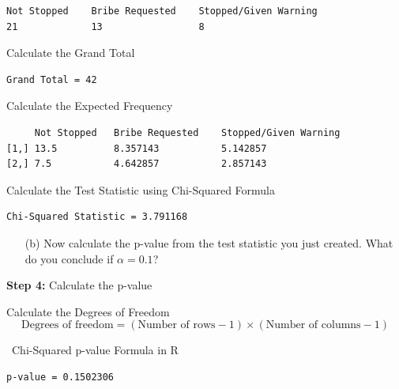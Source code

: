 \documentclass[12pt,letterpaper]{article}
\begin{document}
\begin{verbatim}
Not Stopped    Bribe Requested	  Stopped/Given Warning 
21             13                 8 
\end{verbatim}

\vspace{0.5cm}
\noindent Calculate the Grand Total


\begin{verbatim}
Grand Total = 42
\end{verbatim}

\vspace{0.5cm}
\noindent Calculate the Expected Frequency


\begin{verbatim}
     Not Stopped   Bribe Requested    Stopped/Given Warning
[1,] 13.5          8.357143           5.142857
[2,] 7.5           4.642857           2.857143
\end{verbatim}

\vspace{0.5cm}
\noindent Calculate the Test Statistic using Chi-Squared Formula


\begin{verbatim}
Chi-Squared Statistic = 3.791168
\end{verbatim}

\newpage
\begin{enumerate}
	\item [(b)]
	Now calculate the p-value from the test statistic you just created. What do you conclude if $\alpha = 0.1$?\\
\end{enumerate}

\noindent\textbf{Step 4:} Calculate the p-value

\vspace{0.5cm}
\noindent Calculate the Degrees of Freedom
\[
\text{Degrees of freedom} = (\text{Number of rows} - 1) \times (\text{Number of columns} - 1)
\]


\vspace{0.5cm}
\noindent\ Chi-Squared p-value Formula in R

\begin{verbatim}
p-value = 0.1502306
\end{verbatim}
\end{document}
